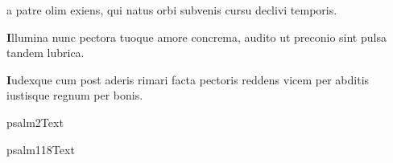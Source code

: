 \documentclass[11pt,openany]{book}
\newcommand*\zallmancaps{\usefont{U}{Zallman}{xl}{n}}
\newcommand{\doxology}{%
	Glória Patri, et Fílio, * et Spirítui Sancto. \\
	Sicut erat in princípio, et nunc, et semper, * et in sǽcula sæculórum. Amen. \\
}
\newcommand{\psalm}[1]{%
	\noindent{\textit{\csname psalm#1Incipit\endcsname}}.%
}
\newcommand{\fullpsalm}[1]{%
	\begingroup %
		\setlength{\parindent}{1em} %
		\renewcommand{\\}{\par\hspace*{1em}} %
		\csname psalm#1Text\endcsname %
	\endgroup %
}
\newcommand{\ubsubsection}[2]{%
	\subsection*{#1}%
	\phantomsection%
	\addcontentsline{toc}{subsection}{#1}%
	\hypertarget{#2}{}%
}
\begin{document}
\begin{multicols*}{2}
{a patre olim exiens,
qui natus orbi subvenis
cursu declivi temporis.
\par {\bfseries \color{Red} I}llumina nunc pectora
tuoque amore concrema,
audito ut preconio
sint pulsa tandem lubrica.
\par {\bfseries \color{Blue} I}udexque cum post aderis
rimari facta pectoris
reddens vicem per abditis
iustisque regnum per bonis.
}










\fullpsalm{2}



\fullpsalm{118}

\end{multicols*}
\end{document}
